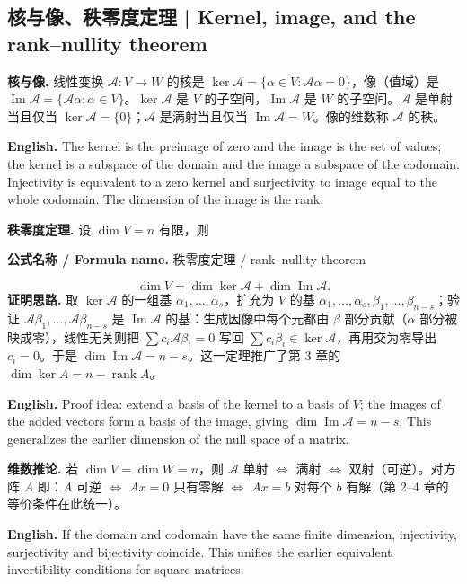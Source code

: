 \documentclass[UTF8,11pt,a4paper]{ctexart}
\newcommand{\EN}[1]{\par\noindent\textbf{English.} #1\par}
\newcommand{\FORMULA}[2]{\par\noindent\textbf{公式名称 / Formula name.} #1 / #2\par}
\begin{document}
\subsection{核与像、秩零度定理 | Kernel, image, and the rank--nullity theorem}
\noindent\textbf{核与像.} 线性变换 $\mathcal A:V\to W$ 的核是 $\ker\mathcal A=\{\alpha\in V:\mathcal A\alpha=0\}$，像（值域）是 $\operatorname{Im}\mathcal A=\{\mathcal A\alpha:\alpha\in V\}$。$\ker\mathcal A$ 是 $V$ 的子空间，$\operatorname{Im}\mathcal A$ 是 $W$ 的子空间。$\mathcal A$ 是单射当且仅当 $\ker\mathcal A=\{0\}$；$\mathcal A$ 是满射当且仅当 $\operatorname{Im}\mathcal A=W$。像的维数称 $\mathcal A$ 的秩。
\EN{The kernel is the preimage of zero and the image is the set of values; the kernel is a subspace of the domain and the image a subspace of the codomain. Injectivity is equivalent to a zero kernel and surjectivity to image equal to the whole codomain. The dimension of the image is the rank.}
\noindent\textbf{秩零度定理.} 设 $\dim V=n$ 有限，则
\FORMULA{秩零度定理}{rank--nullity theorem}
\[
\dim V=\dim\ker\mathcal A+\dim\operatorname{Im}\mathcal A.
\]
\noindent\textbf{证明思路.} 取 $\ker\mathcal A$ 的一组基 $\alpha_1,\dots,\alpha_s$，扩充为 $V$ 的基 $\alpha_1,\dots,\alpha_s,\beta_1,\dots,\beta_{n-s}$；验证 $\mathcal A\beta_1,\dots,\mathcal A\beta_{n-s}$ 是 $\operatorname{Im}\mathcal A$ 的基：生成因像中每个元都由 $\beta$ 部分贡献（$\alpha$ 部分被映成零），线性无关则把 $\sum c_i\mathcal A\beta_i=0$ 写回 $\sum c_i\beta_i\in\ker\mathcal A$，再用交为零导出 $c_i=0$。于是 $\dim\operatorname{Im}\mathcal A=n-s$。这一定理推广了第 3 章的 $\dim\ker A=n-\operatorname{rank}A$。
\EN{Proof idea: extend a basis of the kernel to a basis of $V$; the images of the added vectors form a basis of the image, giving $\dim\operatorname{Im}\mathcal A=n-s$. This generalizes the earlier dimension of the null space of a matrix.}
\noindent\textbf{维数推论.} 若 $\dim V=\dim W=n$，则 $\mathcal A$ 单射 $\iff$ 满射 $\iff$ 双射（可逆）。对方阵 $A$ 即：$A$ 可逆 $\iff$ $Ax=0$ 只有零解 $\iff$ $Ax=b$ 对每个 $b$ 有解（第 2--4 章的等价条件在此统一）。
\EN{If the domain and codomain have the same finite dimension, injectivity, surjectivity and bijectivity coincide. This unifies the earlier equivalent invertibility conditions for square matrices.}
\end{document}
